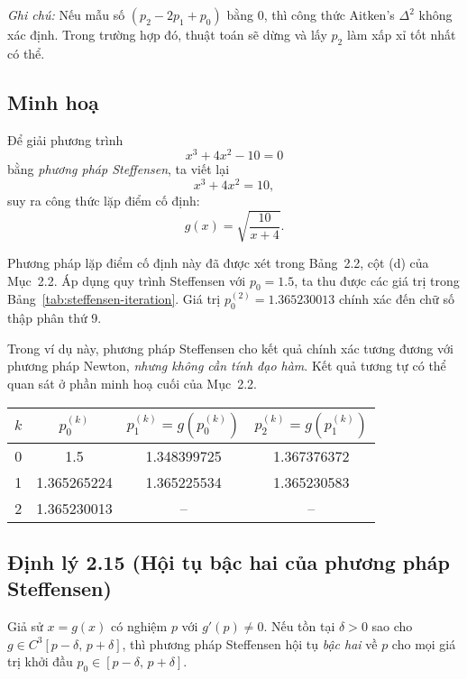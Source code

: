 \textit{Ghi chú:}  
Nếu mẫu số $(p_2 - 2p_1 + p_0)$ bằng 0, 
thì công thức Aitken’s $\Delta^2$ không xác định. 
Trong trường hợp đó, thuật toán sẽ dừng và 
lấy $p_2$ làm xấp xỉ tốt nhất có thể.

\subsection*{Minh hoạ}

Để giải phương trình
\[
x^3 + 4x^2 - 10 = 0
\]
bằng \textit{phương pháp Steffensen}, ta viết lại
\[
x^3 + 4x^2 = 10,
\]
suy ra công thức lặp điểm cố định:
\[
g(x) = \sqrt{\frac{10}{x + 4}}.
\]

Phương pháp lặp điểm cố định này đã được xét trong Bảng~2.2, cột (d) của Mục~2.2.  
Áp dụng quy trình Steffensen với $p_0 = 1.5$, ta thu được các giá trị trong Bảng~\ref{tab:steffensen-iteration}.  
Giá trị $p_0^{(2)} = 1.365230013$ chính xác đến chữ số thập phân thứ 9.  

Trong ví dụ này, phương pháp Steffensen cho kết quả chính xác tương đương 
với phương pháp Newton, \textit{nhưng không cần tính đạo hàm}.  
Kết quả tương tự có thể quan sát ở phần minh hoạ cuối của Mục~2.2.

\begin{center}
\label{tab:steffensen-iteration}
\begin{tabular}{|c|c|c|c|}
\hline
$k$ & $p_0^{(k)}$ & $p_1^{(k)} = g(p_0^{(k)})$ & $p_2^{(k)} = g(p_1^{(k)})$ \\
\hline
0 & 1.5 & 1.348399725 & 1.367376372 \\
1 & 1.365265224 & 1.365225534 & 1.365230583 \\
2 & 1.365230013 & -- & -- \\
\hline
\end{tabular}
\end{center}

\subsection*{\textbf{Định lý 2.15 (Hội tụ bậc hai của phương pháp Steffensen)}}

Giả sử $x = g(x)$ có nghiệm $p$ với $g'(p) \neq 0$.  
Nếu tồn tại $\delta > 0$ sao cho $g \in C^3[p - \delta,\, p + \delta]$, 
thì phương pháp Steffensen hội tụ \textit{bậc hai} về $p$ 
cho mọi giá trị khởi đầu $p_0 \in [p - \delta,\, p + \delta]$.



